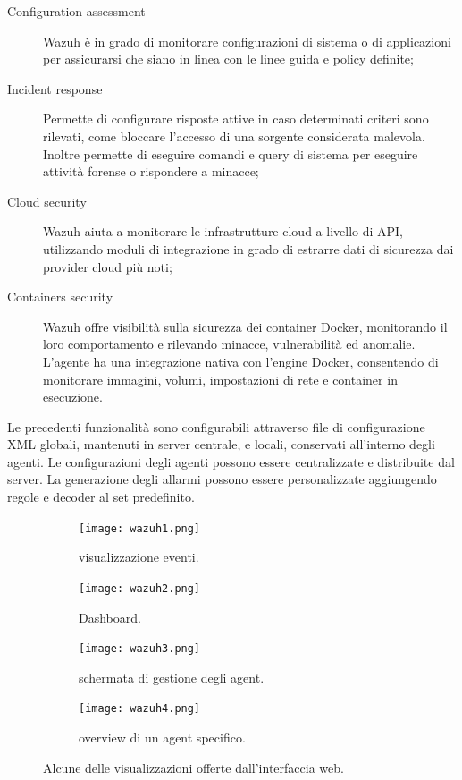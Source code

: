 \begin{description}
    \item [Configuration assessment] Wazuh è in grado di monitorare configurazioni di sistema o di applicazioni per assicurarsi che siano in linea con le linee guida e policy definite;
    \item [Incident response] Permette di configurare risposte attive in caso determinati criteri sono rilevati, come bloccare l'accesso di una sorgente considerata malevola. Inoltre permette di eseguire comandi e query di sistema per eseguire attività forense o rispondere a minacce;
    \item [Cloud security] Wazuh aiuta a monitorare le infrastrutture cloud a livello di API, utilizzando moduli di integrazione in grado di estrarre dati di sicurezza dai provider cloud più noti;
    \item [Containers security] Wazuh offre visibilità sulla sicurezza dei container Docker, monitorando il loro comportamento e rilevando minacce, vulnerabilità ed anomalie. L'agente  ha una integrazione nativa con l'engine Docker, consentendo di monitorare immagini, volumi, impostazioni di rete e container in esecuzione.
\end{description}

Le precedenti funzionalità sono configurabili attraverso file di configurazione XML globali, mantenuti in server centrale, e locali, conservati all'interno degli agenti. Le configurazioni degli agenti possono essere centralizzate e distribuite dal server. La generazione degli allarmi possono essere personalizzate aggiungendo regole e decoder al set predefinito.


\begin{figure}[hbtp]
    \centering
    \begin{subfigure}{0.45\textwidth}
        \centering
        \texttt{[image: wazuh1.png]}
        \caption{visualizzazione eventi.}
        \label{fig:wazuh1}
    \end{subfigure}
    \begin{subfigure}{0.45\textwidth}
        \centering
        \texttt{[image: wazuh2.png]}
        \caption{Dashboard.}
        \label{fig:wazuh2}
    \end{subfigure}
    \begin{subfigure}{0.45\textwidth}
        \centering
        \texttt{[image: wazuh3.png]}
        \caption{schermata di gestione degli agent.}
        \label{fig:wazuh3}
    \end{subfigure}
    \begin{subfigure}{0.45\textwidth}
        \centering
        \texttt{[image: wazuh4.png]}
        \caption{overview di un agent specifico.}
        \label{fig:wazuh4}
    \end{subfigure}
    \caption{Alcune delle visualizzazioni offerte dall'interfaccia web.}
\end{figure}

